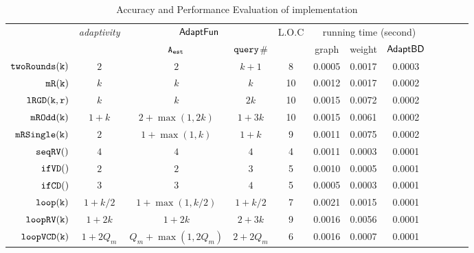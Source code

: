 {\footnotesize
\begin {table}[H]
\vspace{-0.4cm}
    \caption{Accuracy and Performance Evaluation of {\THESYSTEM} implementation}
    \vspace{-0.5cm}
        \label{tb:adapt-imp}
        \begin{center}
        \centering
{\tiny
        \begin{tabular}{| >{\tiny}r | c | c | c | c | c | c | c | c | c | c | c }
         \hline \hline
        \multirow{2}{*}{Program $c$} & 
        \multirow{2}{*}{\emph{adaptivity}}
         & \multicolumn{2}{c|}{$\textsf{AdaptFun}$}
         & {L.O.C}
         & \multicolumn{3}{c|}{running time (second)} \\ 
         \cline{3-8}
         & & {${\mathtt{A_{est}}}$ } & {${\tt query}$\# } &  & graph & weight & $\mathsf{AdaptBD}$ \\ 
         \cline{6-8}
         \hline \hline
         $  \mathtt{twoRounds(k)}$ & $2$ &  $2$ & $k+1 $  & 8 & 0.0005 & 0.0017 & 0.0003 \\
         $  \mathtt{mR(k)}$ & $k$ &  $k$ & $k$  &  10 & 0.0012 & 0.0017  & 0.0002 \\
         $  \mathtt{lRGD(k, r)}$ & $k$ & $k  $ & $ 2k $  &  10 & 0.0015 & 0.0072  & 0.0002  \\
         $  \mathtt{mROdd(k)}$ & $1 + k$ &  $2+\max(1,2k)  $ & $1 + 3 k  $  &  10 & 0.0015 & 0.0061  & 0.0002 \\
         $  \mathtt{mRSingle(k)}$    & $2$ &  $1+ \max(1, k) $ & $1 + k $  &  9 & 0.0011 & 0.0075  & 0.0002 \\
         $  \mathtt{seqRV()}$ & $4$ & $4$ &  $4$ & 4 & 0.0011 & 0.0003 & 0.0001 \\  
         $  \mathtt{ifVD()}$ & $2$ & $2$ &  $3$ & 5 & 0.0010 & 0.0005  & 0.0001 \\
         $  \mathtt{ifCD()}$ & $3$ & $3 $ &   $4$  & 5 & 0.0005 & 0.0003   & 0.0001 \\
         $  \mathtt{loop(k)}$ & $1+k/2$ &   $1 +\max(1, k/2)  $  &  $1+k/2  $ & 7 & 0.0021 & 0.0015 &  0.0001 \\
         $  \mathtt{loopRV(k)}$ & $1 + 2k$ &  $1 + 2k$ & $2 + 3 k$  &  9 & 0.0016 & 0.0056 & 0.0001  \\
         $  {\mathtt{loopVCD(k)}} $ & ${1 + 2Q_m}$ &  ${Q_m+\max(1,2Q_m)}$  & $2+2Q_m$   &  6 & 0.0016 & 0.0007 & 0.0001 \\

\end{tabular}}
\end{center}
\end{table}}

